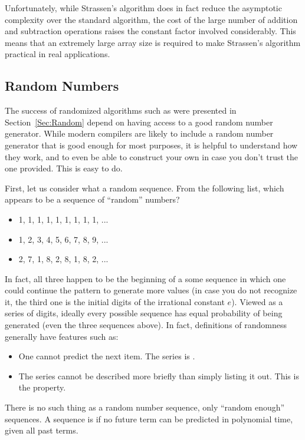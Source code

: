 Unfortunately, while Strassen's algorithm does in fact reduce the
asymptotic complexity over the standard algorithm, the cost of the
large number of addition and subtraction operations raises the
constant factor involved considerably.
This means that an extremely large array size is required to make
Strassen's algorithm practical in real applications.

\subsection{Random Numbers}

The success of randomized algorithms such as were presented in
Section~\ref{Sec:Random} depend on having access to a good random
number generator.
While modern compilers are likely to include a random number generator
that is good enough for most purposes, it is helpful to understand how
they work, and to even be able to construct your own in case you don't
trust the one provided.
This is easy to do.

First, let us consider what a random sequence.
From the following list, which appears to be a sequence of ``random''
numbers?
\begin{itemize}
\item 1, 1, 1, 1, 1, 1, 1, 1, 1, ...
\item 1, 2, 3, 4, 5, 6, 7, 8, 9, ...
\item 2, 7, 1, 8, 2, 8, 1, 8, 2, ...
\end{itemize}

In fact, all three happen to be the beginning of a some sequence in
which one could continue the pattern to generate more values (in case
you do not recognize it, the third one is the initial digits of the
irrational constant $e$).
Viewed as a series of digits, ideally every possible sequence has
equal probability of being generated (even the three sequences
above).
In fact, definitions of randomness generally have features such as:
\begin{itemize}
\item One cannot predict the next item. The series is .
\item The series cannot be described more briefly than simply listing
it out. This is the  property.
\end{itemize}

There is no such thing as a random number sequence, only ``random
enough'' sequences.
A sequence is  if no future term can be predicted
in polynomial time, given all past terms.

